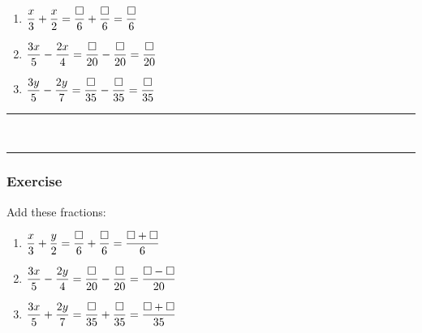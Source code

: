 \documentclass[a4paper,12pt]{article}
\newcommand\question{
	 \rule[0pt]{17cm}{0.5pt}\vspace{-0.5cm}
	\subsubsection{Exercise}

}
\newcommand\questionend{
	\rule[0pt]{17cm}{0.5pt}\vspace{0.0cm}\\
}
\begin{document}
\begin{multicols}{3}
	\begin{enumerate}[label=\normalsize \alph*)~~~ , topsep=16pt,itemsep=25pt,partopsep=4pt, parsep=4pt]
		\item $\displaystyle \frac{x}{3} + \frac{x}{2}\\\\ =\frac{\square}{6}+\frac{\square}{6}\\\\ =\frac{\square}{6}$
		\item $\displaystyle \frac{3x}{5} - \frac{2x}{4}\\\\=\frac{\square}{20} - \frac{\square}{20}\\\\ = \frac{\square }{20}$
		\item $\displaystyle \frac{3y}{5} - \frac{2y}{7}\\\\=\frac{\square}{35} - \frac{\square}{35} \\\\ = \frac{\square}{35}$
	\end{enumerate}
\end{multicols}
\questionend
\newpage
\question
 Add these fractions:
\begin{multicols}{3}
\begin{enumerate}[label=\normalsize \alph*)~~~ , topsep=16pt,itemsep=25pt,partopsep=4pt, parsep=4pt]
\item $\displaystyle \frac{x}{3} + \frac{y}{2}\\\\ =\frac{\square}{6}+\frac{\square}{6}\\\\ =\frac{\square + \square }{6}$
\item $\displaystyle \frac{3x}{5} - \frac{2y}{4}\\\\=\frac{\square}{20} - \frac{\square}{20}\\\\ = \frac{\square  - \square }{20}$
\item $\displaystyle \frac{3x}{5} + \frac{2y}{7}\\\\=\frac{\square}{35} + \frac{\square}{35} \\\\ = \frac{\square + \square }{35}$
	\end{enumerate}
\end{multicols}
\end{document}
